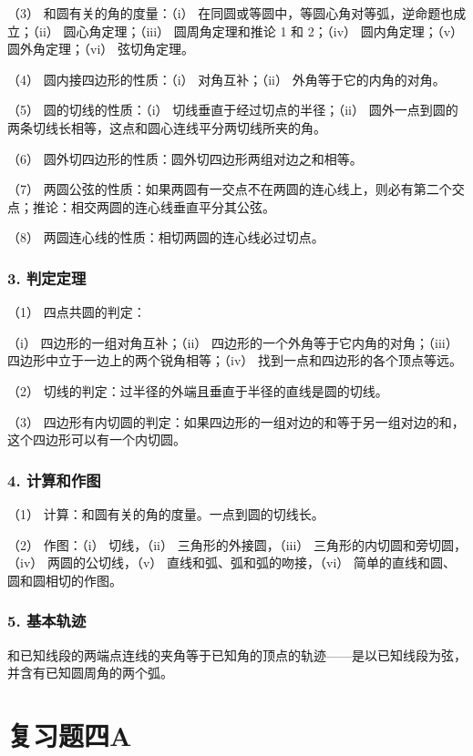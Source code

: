 （3） 和圆有关的角的度量：（i）
在同圆或等圆中，等圆心角对等弧，逆命题也成立；（ii） 圆心角定理；（iii）
圆周角定理和推论 1 和 2；（iv） 圆内角定理；（v） 圆外角定理；（vi）
弦切角定理。

（4） 圆内接四边形的性质：（i） 对角互补；（ii）
外角等于它的内角的对角。

（5） 圆的切线的性质：（i） 切线垂直于经过切点的半径；（ii）
圆外一点到圆的两条切线长相等，这点和圆心连线平分两切线所夹的角。

（6） 圆外切四边形的性质：圆外切四边形两组对边之和相等。

（7）
两圆公弦的性质：如果两圆有一交点不在两圆的连心线上，则必有第二个交点；推论：相交两圆的连心线垂直平分其公弦。

（8） 两圆连心线的性质：相切两圆的连心线必过切点。

\subsubsection{3. 判定定理}

（1） 四点共圆的判定：

（i） 四边形的一组对角互补；（ii）
四边形的一个外角等于它内角的对角；（iii）
四边形中立于一边上的两个锐角相等；（iv）
找到一点和四边形的各个顶点等远。

（2） 切线的判定：过半径的外端且垂直于半径的直线是圆的切线。

（3）
四边形有内切圆的判定：如果四边形的一组对边的和等于另一组对边的和，这个四边形可以有一个内切圆。

\subsubsection{4. 计算和作图}

（1） 计算：和圆有关的角的度量。一点到圆的切线长。

（2） 作图：（i） 切线，（ii） 三角形的外接圆，（iii）
三角形的内切圆和旁切圆，（iv） 两圆的公切线，（v）
直线和弧、弧和弧的吻接，（vi） 简单的直线和圆、圆和圆相切的作图。

\subsubsection{5. 基本轨迹}

和已知线段的两端点连线的夹角等于已知角的顶点的轨迹------是以已知线段为弦，并含有已知圆周角的两个弧。

\section{复习题四A}


